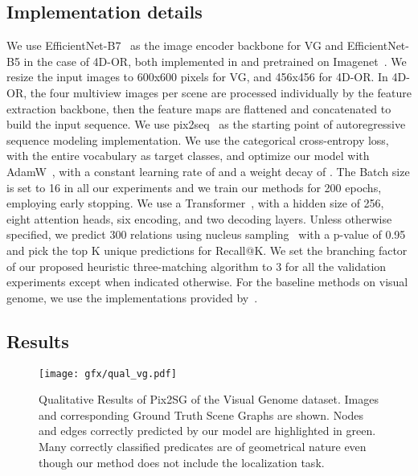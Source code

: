 \documentclass[10pt,twocolumn,letterpaper]{article}
\begin{document}
\subsection{Implementation details}
We use EfficientNet-B7~\cite{tan_efficientnet_2020} as the image encoder backbone for VG and EfficientNet-B5 in the case of 4D-OR, both implemented in \cite{wightman_pytorch_2019} and pretrained on Imagenet~\cite{russakovsky_imagenet_2015}. We resize the input images to 600x600 pixels for VG, and 456x456 for 4D-OR. In 4D-OR, the four multiview images per scene are processed individually by the feature extraction backbone, then the feature maps are flattened and concatenated to build the input sequence. We use pix2seq~\cite{chen_pix2seq_2022} as the starting point of autoregressive sequence modeling implementation.
We use the categorical cross-entropy loss, with the entire vocabulary as target classes, and optimize our model with AdamW~\cite{loshchilov_decoupled_2019}, with a constant learning rate of  and a weight decay of . The Batch size is set to 16 in all our experiments and we train our methods for 200 epochs, employing early stopping. We use a Transformer~\cite{vaswani_attention_2017}, with a hidden size of 256, eight attention heads, six encoding, and two decoding layers. Unless otherwise specified, we predict 300 relations using nucleus sampling~\cite{holtzman_curious_2020} with a p-value of 0.95 and pick the top K unique predictions for Recall@K. We set the branching factor  of our proposed heuristic three-matching algorithm to 3 for all the validation experiments except when indicated otherwise. For the baseline methods on  visual genome, we use the implementations provided by~\cite{tang_scene_2020}. 



\subsection{Results}
\label{sec:results}
\begin{figure*}[t]
  \centering
   \texttt{[image: gfx/qual\_vg.pdf]}
   \caption{Qualitative Results of Pix2SG of the Visual Genome dataset. Images and corresponding Ground Truth Scene Graphs are shown. Nodes and edges correctly predicted by our model are highlighted in green. Many correctly classified predicates are of geometrical nature even though our method does not include the localization task.}
   \label{fig:qual_vg}
\end{figure*}
\end{document}
